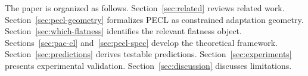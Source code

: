 The paper is organized as follows.
Section~\ref{sec:related} reviews related work.
Section~\ref{sec:pecl-geometry} formalizes PECL as constrained adaptation geometry.
Section~\ref{sec:which-flatness} identifies the relevant flatness object.
Sections~\ref{sec:pac-cl} and~\ref{sec:pecl-spec} develop the theoretical framework.
Section~\ref{sec:predictions} derives testable predictions.
Section~\ref{sec:experiments} presents experimental validation.
Section~\ref{sec:discussion} discusses limitations.
